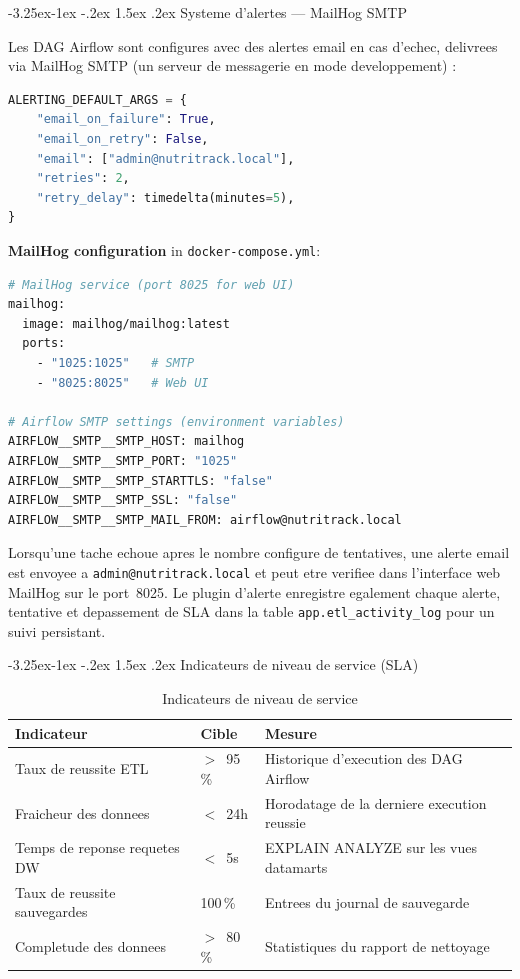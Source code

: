 \documentclass[a4paper,11pt,oneside,openany]{report}
\makeatletter
\renewcommand\subsection{\@startsection{subsection}{2}{\z@}%
  {-3.25ex\@plus -1ex \@minus -.2ex}%
  {1.5ex \@plus .2ex}%
  {\normalfont\large\bfseries\color{ntdarkgreen}}}
\makeatother
\begin{document}
\subsection{Systeme d'alertes --- MailHog SMTP}

Les DAG Airflow sont configures avec des alertes email en cas d'echec,
delivrees via MailHog SMTP (un serveur de messagerie en mode
developpement) :

\begin{lstlisting}[language=Python, caption={Alerting default configuration (airflow/plugins/alerting.py)}]
ALERTING_DEFAULT_ARGS = {
    "email_on_failure": True,
    "email_on_retry": False,
    "email": ["admin@nutritrack.local"],
    "retries": 2,
    "retry_delay": timedelta(minutes=5),
}
\end{lstlisting}

\textbf{MailHog configuration} in \texttt{docker-compose.yml}:

\begin{lstlisting}[language=bash, caption={MailHog service and Airflow SMTP configuration}]
# MailHog service (port 8025 for web UI)
mailhog:
  image: mailhog/mailhog:latest
  ports:
    - "1025:1025"   # SMTP
    - "8025:8025"   # Web UI

# Airflow SMTP settings (environment variables)
AIRFLOW__SMTP__SMTP_HOST: mailhog
AIRFLOW__SMTP__SMTP_PORT: "1025"
AIRFLOW__SMTP__SMTP_STARTTLS: "false"
AIRFLOW__SMTP__SMTP_SSL: "false"
AIRFLOW__SMTP__SMTP_MAIL_FROM: airflow@nutritrack.local
\end{lstlisting}

Lorsqu'une tache echoue apres le nombre configure de tentatives, une
alerte email est envoyee a \texttt{admin@nutritrack.local} et peut etre
verifiee dans l'interface web MailHog sur le port~8025. Le plugin
d'alerte enregistre egalement chaque alerte, tentative et depassement
de SLA dans la table \texttt{app.etl\_activity\_log} pour un suivi
persistant.

\subsection{Indicateurs de niveau de service (SLA)}

\begin{table}[H]
\centering
\caption{Indicateurs de niveau de service}
\label{tab:sla}
\begin{tabularx}{\textwidth}{L{4cm} C{2cm} L{6.5cm}}
\toprule
\textbf{Indicateur} & \textbf{Cible} & \textbf{Mesure} \\
\midrule
Taux de reussite ETL & $>$~95\,\% & Historique d'execution des DAG Airflow \\
Fraicheur des donnees & $<$~24h & Horodatage de la derniere execution reussie \\
Temps de reponse requetes DW & $<$~5s & EXPLAIN ANALYZE sur les vues datamarts \\
Taux de reussite sauvegardes & 100\,\% & Entrees du journal de sauvegarde \\
Completude des donnees & $>$~80\,\% & Statistiques du rapport de nettoyage \\
\bottomrule
\end{tabularx}
\end{table}
\end{document}
